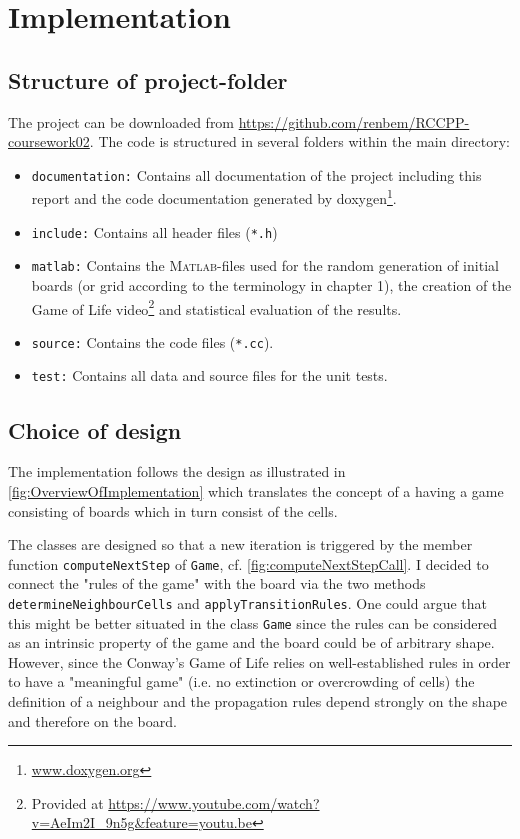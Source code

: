 \chapter{Implementation}


\section{Structure of project-folder}
The project can be downloaded from \url{https://github.com/renbem/RCCPP-coursework02}. The code is structured in several folders within the main directory:
\begin{itemize}
	\item \texttt{documentation:} Contains all documentation of the project including this report and the code documentation generated by doxygen\footnote{\url{www.doxygen.org}}.
	\item \texttt{include:} Contains all header files (\texttt{*.h})
	\item \texttt{matlab:} Contains the \textsc{Matlab}-files used for the random generation of initial boards (or grid according to the terminology in chapter 1), the creation of the Game of Life video\footnote{Provided at \url{https://www.youtube.com/watch?v=AeIm2I_9n5g&feature=youtu.be}} and statistical evaluation of the results.
	\item \texttt{source:} Contains the code files (\texttt{*.cc}).
	\item \texttt{test:}  Contains all data and source files for the unit tests.
\end{itemize}

\section{Choice of design}
The implementation follows the design as illustrated in \cref{fig:OverviewOfImplementation} which translates the concept of a having a game consisting of boards which in turn consist of the cells.

The classes are designed so that a new iteration is triggered by the member function \texttt{computeNextStep} of \texttt{Game}, cf. \cref{fig:computeNextStepCall}. I decided to connect the "rules of the game" with the board via the two methods \texttt{determineNeighbourCells} and \texttt{applyTransitionRules}. One could argue that this might be better situated in the class \texttt{Game} since the rules can be considered as an intrinsic property of the game and the board could be of arbitrary shape. However, since the Conway's Game of Life relies on well-established rules in order to have a "meaningful game" (i.e. no extinction or overcrowding of cells) the definition of a neighbour and the propagation rules depend strongly on the shape and therefore on the board.

